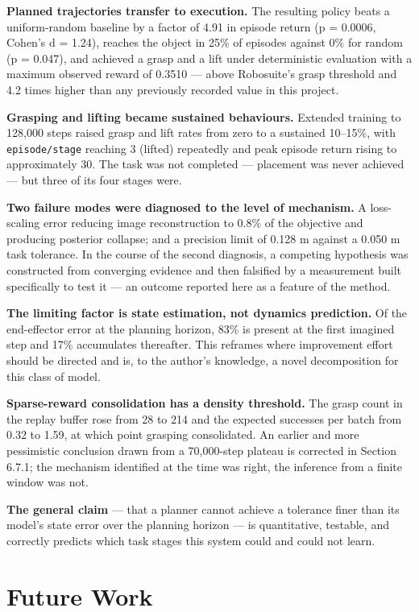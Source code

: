 \documentclass[12pt,a4paper,oneside]{report}
\begin{document}
\textbf{Planned trajectories transfer to execution.} The resulting policy beats a
uniform-random baseline by a factor of 4.91 in episode return
(p = 0.0006, Cohen's d = 1.24), reaches the object in 25\% of episodes
against 0\% for random (p = 0.047), and achieved a grasp and a lift under
deterministic evaluation with a maximum observed reward of 0.3510 --- above
Robosuite's grasp threshold and 4.2 times higher than any previously recorded
value in this project.

\textbf{Grasping and lifting became sustained behaviours.} Extended training to
128,000 steps raised grasp and lift rates from zero to a sustained 10--15\%, with
\texttt{episode/stage} reaching 3 (lifted) repeatedly and peak episode return rising to
approximately 30. The task was not completed --- placement was never achieved ---
but three of its four stages were.

\textbf{Two failure modes were diagnosed to the level of mechanism.} A loss-scaling
error reducing image reconstruction to 0.8\% of the objective and producing
posterior collapse; and a precision limit of 0.128 m against a 0.050 m task
tolerance. In the course of the second diagnosis, a competing hypothesis was
constructed from converging evidence and then falsified by a measurement built
specifically to test it --- an outcome reported here as a feature of the method.

\textbf{The limiting factor is state estimation, not dynamics prediction.} Of the
end-effector error at the planning horizon, 83\% is present at the first imagined
step and 17\% accumulates thereafter. This reframes where improvement effort
should be directed and is, to the author's knowledge, a novel decomposition for
this class of model.

\textbf{Sparse-reward consolidation has a density threshold.} The grasp count in the
replay buffer rose from 28 to 214 and the expected successes per batch from 0.32
to 1.59, at which point grasping consolidated. An earlier and more pessimistic
conclusion drawn from a 70,000-step plateau is corrected in Section 6.7.1; the
mechanism identified at the time was right, the inference from a finite window
was not.

\textbf{The general claim} --- that a planner cannot achieve a tolerance finer than its
model's state error over the planning horizon --- is quantitative, testable, and
correctly predicts which task stages this system could and could not learn.

\hypertarget{future-work}{%
\section{Future Work}\label{future-work}}
\end{document}
